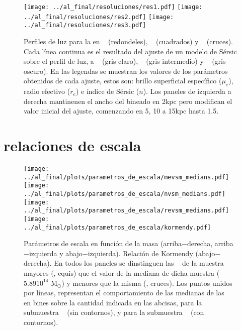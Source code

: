 \begin{figure}[H]
  \hspace*{-1.4cm}\texttt{[image: ../al\_final/resoluciones/res1.pdf]}
  \hspace*{.1cm}\texttt{[image: ../al\_final/resoluciones/res2.pdf]}
  \hspace*{.1cm}\texttt{[image: ../al\_final/resoluciones/res3.pdf]}
\caption{Perfiles de luz para la  en \lr~ (redondeles), \mr~ (cuadrados) y \hr~ (cruces).
Cada l\'inea continua es el resultado del ajuste de un modelo de S\'ersic sobre el perfil de luz, a \lr~ (gris claro), \mr~ (gris intermedio) y \hr~ (gris oscuro). En las legendas 
se muestran los valores de los par\'ametros obtenidos de cada ajuste, estos son: brillo superficial espec\'ifico ($\mu_{e}$), radio efectivo ($r_{e}$) e \'indice de S\'ersic ($n$).
Los paneles de izquierda a derecha mantinenen el ancho del bineado en 2kpc pero modifican el valor inicial del ajuste, comenzando en 5, 10 a 15kpc hasta 1.5\rvc.}
\label{fig:resoluciones}
\end{figure}

\section{relaciones de escala}



\begin{figure}[H]
 \texttt{[image: ../al\_final/plots/parametros\_de\_escala/mevsm\_medians.pdf]}
 \texttt{[image: ../al\_final/plots/parametros\_de\_escala/nvsm\_medians.pdf]}
 \\
 \texttt{[image: ../al\_final/plots/parametros\_de\_escala/revsm\_medians.pdf]}
 \texttt{[image: ../al\_final/plots/parametros\_de\_escala/kormendy.pdf]}
\caption{Par\'ametros de escala en funci\'on de la masa \mvc (arriba$-$derecha, arriba$-$izquierda y abajo$-$izquierda). Relaci\'on de Kormendy (abajo$-$derecha). En todos los paneles
se dinstinguen las \bcgs~ de la muestra \aum~ mayores (\aumu, equis) que el valor de la mediana de dicha muestra ($5.8910^{14}$ M$_{\odot}$) y menores que la misma (\aumd, cruces). Los puntos 
unidos por l\'ineas, representan el comportamiento de las medianas de las \bcgs~ en bines sobre la cantidad indicada en las abcisas, para la submuestra \aumu~ (sin contornos),
y para la submuestra \aumd~ (con contornos).}
\label{fig:mue}
\end{figure}


